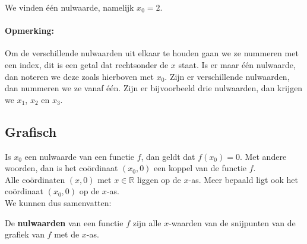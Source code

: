 \documentclass[12pt,twoside]{article}
\begin{document}
\begin{theorie}
We vinden één nulwaarde, namelijk $x_0=2$.

\paragraph*{Opmerking:} Om de verschillende nulwaarden uit elkaar te houden gaan we ze nummeren met een index, dit is een getal dat rechtsonder de $x$ staat. Is er maar één nulwaarde, dan noteren we deze zoals hierboven met $x_0$. Zijn er verschillende nulwaarden, dan nummeren we ze vanaf één. Zijn er bijvoorbeeld drie nulwaarden, dan krijgen we $x_1$, $x_2$ en $x_3$.


\subsection{Grafisch}

\begin{minipage}{0.5\textwidth}
  Is $x_0$ een nulwaarde van een functie $f$, dan geldt dat $f(x_0)=0$. Met andere woorden, dan is het coördinaat $(x_0,0)$ een koppel van de functie $f$.\\

  Alle coördinaten $(x,0)$ met $x\in\mathbb{R}$ liggen op de $x$-as. Meer bepaald ligt ook het coördinaat $(x_0,0)$ op de $x$-as.\\

  We kunnen dus samenvatten:
\end{minipage}
\begin{minipage}{0.5\textwidth}
  \begin{center}
  \end{center}
\end{minipage}

De {\bf nulwaarden} van een functie $f$ zijn alle $x$-waarden van de snijpunten van de grafiek van $f$ met de $x$-as.

\end{theorie}
\end{document}
